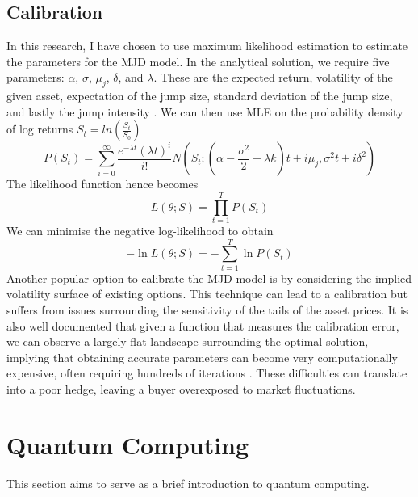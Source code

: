 \documentclass[12pt]{article}
\numberwithin{equation}{section}
\begin{document}
\subsection{Calibration}
In this research, I have chosen to use maximum likelihood estimation to estimate 
the parameters for the MJD model. In the analytical solution, we require five 
parameters: $\alpha$, $\sigma$, $\mu_j$, $\delta$, and $\lambda$. These are the 
expected return, volatility of the given asset, expectation of the jump size, 
standard deviation of the jump size, and lastly the jump intensity
\autocite{calibration1,mlecalibration,paramcalibration}. 
We can then 
use MLE on the probability density of log returns $S_t = ln(\frac{S_t}{S_0})$ 
\begin{equation}
P(S_t) = \sum^\infty_{i=0} \frac{e^{-\lambda t}(\lambda t)^i}{i!}N(S_t;(\alpha - 
\frac{\sigma^2}{2}-\lambda k)t+i\mu_j,\sigma^2t+i\delta^2)
\end{equation}
The likelihood function hence becomes 
\begin{equation}
  L(\theta;S) = \prod^T_{t=1}P(S_t)
\end{equation}
We can minimise the negative log-likelihood to obtain 
\begin{equation}
  -\ln L(\theta;S) = -\sum^T_{t=1}\ln P(S_t)
\end{equation}
Another popular option to calibrate the MJD model is by considering the implied 
volatility surface of existing options. This technique can lead to a 
calibration but suffers from issues surrounding the sensitivity of the tails of 
the asset prices. It is also well documented that given a function that measures 
the calibration error, we can observe a largely flat landscape surrounding the 
optimal solution, 
implying that obtaining accurate parameters can become very computationally 
expensive, often requiring hundreds of iterations \autocite{calibration1}. These difficulties
can translate into a poor hedge, leaving a buyer overexposed to market fluctuations. 

\clearpage


\section{Quantum Computing}
This section aims to serve as a brief introduction to quantum computing. 
\end{document}
